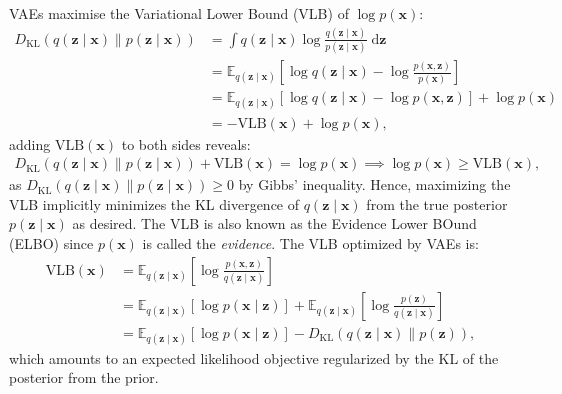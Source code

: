 VAEs maximise the Variational Lower Bound (VLB) of $\log p(\mathbf{x})$:
%
\begin{align}
    D_{\mathrm{KL}} \left(q(\mathbf{z} \mid \mathbf{x}) \parallel p(\mathbf{z} \mid \mathbf{x}) \right) &=  \int q(\mathbf{z} \mid \mathbf{x})  \log \frac{q(\mathbf{z} \mid \mathbf{x})}{p(\mathbf{z} \mid \mathbf{x})} \mathop{\mathrm{d}\mathbf{z}} 
    \\[5pt] &= \mathbb{E}_{q(\mathbf{z} \mid \mathbf{x})} \left[  \log q(\mathbf{z} \mid \mathbf{x}) - \log \frac{p(\mathbf{x}, \mathbf{z})}{p(\mathbf{x})}\right]
    \\[5pt] &= \mathbb{E}_{q(\mathbf{z} \mid \mathbf{x})} \left[  \log q(\mathbf{z} \mid \mathbf{x}) - \log p(\mathbf{x}, \mathbf{z}) \right] + \log p(\mathbf{x})
    \\[5pt] &= -\mathrm{VLB}(\mathbf{x}) + \log p(\mathbf{x}),
\end{align}
%
adding $\mathrm{VLB}(\mathbf{x})$ to both sides reveals:
%
\begin{align}
    D_{\mathrm{KL}} \left(q(\mathbf{z} \mid \mathbf{x}) \parallel p(\mathbf{z} \mid \mathbf{x}) \right) + \mathrm{VLB}(\mathbf{x}) = \log p(\mathbf{x}) \implies \log p(\mathbf{x}) \geq \mathrm{VLB}(\mathbf{x}),
\end{align}
as $D_{\mathrm{KL}} \left(q(\mathbf{z} \mid \mathbf{x}) \parallel p(\mathbf{z} \mid \mathbf{x}) \right) \geq 0$ by Gibbs' inequality. Hence, maximizing the VLB implicitly minimizes the KL divergence of $q(\mathbf{z} \mid \mathbf{x})$ from the true posterior $p(\mathbf{z} \mid \mathbf{x})$ as desired. The VLB is also known as the Evidence Lower BOund (ELBO) since $p(\mathbf{x})$ is called the \textit{evidence}. The VLB optimized by VAEs is:
%
\begin{align}
    \mathrm{VLB}(\mathbf{x}) &= \mathbb{E}_{q(\mathbf{z} \mid \mathbf{x})} \left[\log \frac{p(\mathbf{x}, \mathbf{z})}{q(\mathbf{z} \mid \mathbf{x})}\right]
    \\[5pt] &= \mathbb{E}_{q(\mathbf{z} \mid \mathbf{x})} \left[\log p(\mathbf{x} \mid \mathbf{z})\right]
    + \mathbb{E}_{q(\mathbf{z} \mid \mathbf{x})} \left[\log \frac{p(\mathbf{z})}{q(\mathbf{z} \mid \mathbf{x})} \right]
    \\[5pt] &= \mathbb{E}_{q(\mathbf{z} \mid \mathbf{x})} \left[\log p(\mathbf{x} \mid \mathbf{z})\right] - D_{\mathrm{KL}} \left(q(\mathbf{z} \mid \mathbf{x}) \parallel p(\mathbf{z}) \right),
\end{align}
%
which amounts to an expected likelihood objective regularized by the KL of the posterior from the prior.
